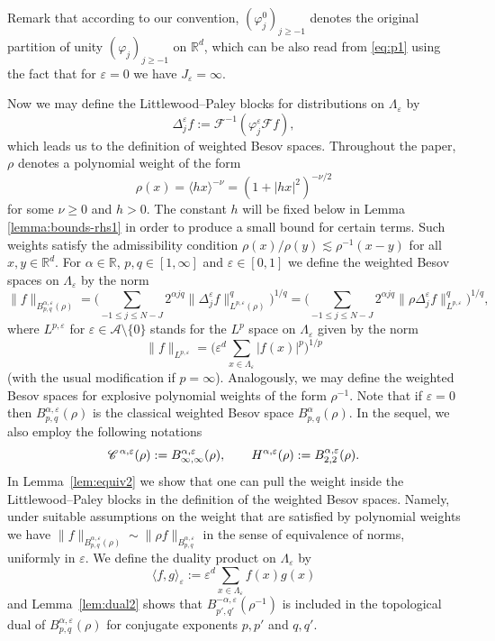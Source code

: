 \documentclass[a4paper,11pt]{article}
\newcommand{\assign}{:=}
\numberwithin{equation}{section}
\newcommand{\CC}{\mathscr{C} \hspace{.1em}}
\begin{document}
Remark that according to our convention, $(\varphi^0_j)_{j \geqslant - 1}$
denotes the original partition of unity $(\varphi_j)_{j \geqslant - 1}$ on
$\mathbb{R}^d$, which can be also read from {\eqref{eq:p1}} using the
fact that for $\varepsilon = 0$ we have $J_{\varepsilon} = \infty$.

Now we may define the Littlewood--Paley blocks for distributions on
$\Lambda_{\varepsilon}$ by
\[ \Delta_j^{\varepsilon} f \assign \mathcal{F}^{- 1} (\varphi_j^{\varepsilon}
   \mathcal{F} f), \]
which leads us to the definition of weighted Besov spaces. Throughout the paper, $\rho$ denotes a polynomial weight 
of the form  \begin{equation}\label{eq:weight}
\rho (x) =
\langle h x \rangle^{- \nu} = (1 + |h  x |^2)^{- \nu / 2}
\end{equation}
 for some $\nu \geqslant
0$ and $h>0$. The constant $h$ will be fixed below in Lemma \ref{lemma:bounds-rhs1} in order to produce a small bound for certain terms.
 Such weights satisfy the admissibility condition $\rho(x)/\rho(y)\lesssim \rho^{-1}(x-y)$
for all $ x, y
   \in \mathbb{R}^d . $
For $\alpha \in \mathbb{R}$, $p, q \in [1, \infty]$ and $\varepsilon \in [0,
1]$ we define the weighted Besov spaces on $\Lambda_{\varepsilon}$ by the norm
\[ \| f \|_{B^{\alpha, \varepsilon}_{p, q} (\rho)} = \Bigg( \sum_{- 1
   \leqslant j \leqslant N - J} 2^{\alpha j q} \| \Delta_j^{\varepsilon} f
   \|_{L^{p, \varepsilon} (\rho)}^q \Bigg)^{1 / q} = \Bigg( \sum_{- 1
   \leqslant j \leqslant N - J} 2^{\alpha j q} \| \rho \Delta_j^{\varepsilon}
   f \|_{L^{p, \varepsilon}}^q \Bigg)^{1 / q}, \]
where $L^{p, \varepsilon}$ for $\varepsilon \in \mathcal{A} \setminus \{ 0 \}$
stands for the $L^p$ space on $\Lambda_{\varepsilon}$ given by the norm
\[ \| f \|_{L^{p, \varepsilon}} = \Bigg( \varepsilon^d \sum_{x \in
   \Lambda_{\varepsilon}} | f (x) |^p \Bigg)^{1 / p} \]
(with the usual modification if $p = \infty$). Analogously, we may define the weighted Besov spaces for explosive polynomial weights of the form $\rho^{-1}$. Note that if $\varepsilon = 0$
then $B^{\alpha, \varepsilon}_{p, q} (\rho)$ is the classical weighted Besov
space $B^{\alpha}_{p, q} (\rho)$. In the sequel, we also employ the following
notations
\[ \CC^{\alpha, \varepsilon} (\rho) \assign B^{\alpha, \varepsilon}_{\infty,
   \infty} (\rho), \qquad H^{\alpha, \varepsilon} (\rho) \assign B^{\alpha,
   \varepsilon}_{2, 2} (\rho) . \]
In Lemma~\ref{lem:equiv2}  we show that one can pull the weight
inside the Littlewood--Paley blocks in the definition of the weighted Besov
spaces. Namely, under suitable assumptions on the weight that are satisfied by
polynomial weights we have
$ \| f \|_{B^{\alpha, \varepsilon}_{p, q} (\rho)} \sim \| \rho f
   \|_{B^{\alpha, \varepsilon}_{p, q}} $
in the sense of equivalence of norms, uniformly in $\varepsilon$.   We define the duality product on
$\Lambda_{\varepsilon}$ by
\[ \langle f, g \rangle_{\varepsilon} \assign \varepsilon^d \sum_{x \in
   \Lambda_{\varepsilon}} f (x) g (x)  \]
and Lemma~\ref{lem:dual2} shows that $B^{- \alpha, \varepsilon}_{p', q'} (\rho^{- 1})$ is
included in the topological dual of $B^{\alpha, \varepsilon}_{p, q} (\rho)$
for conjugate exponents $p, p'$ and $q, q'$.
\end{document}
